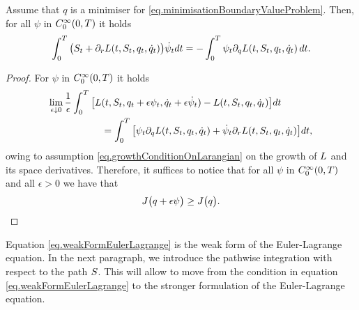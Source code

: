 \documentclass[10pt,a4paper]{article}
\begin{document}
\begin{appendices}
\begin{prop}
Assume that $q$ is a minimiser for \eqref{eq.minimisationBoundaryValueProblem}. Then, for all $\psi$ in $C^{\infty}_{0}(0,T)$ it holds 
\begin{equation}
\label{eq.weakFormEulerLagrange}
\int_{0}^{T} \big( S_t + \partial_r L (t,S_t,q_t,\dot{q}_t) \big ) \dot{\psi}_t dt 
= 
- \int_{0}^{T} \psi_t \partial_q L (t,S_t,q_t,\dot{q}_t) \, dt .
\end{equation}
\end{prop}
\begin{proof}
For $\psi$ in $C^{\infty}_{0}(0,T)$ it holds 
\begin{equation*}
\begin{split}
\lim_{\epsilon \downarrow 0} \frac{1}{\epsilon }\int_{0}^{T} \big[
	L &(t, S_t, q_t + \epsilon \psi_t, \dot{q}_t + \epsilon \dot{\psi}_t ) -  L (t,S_t,q_t, \dot{q}_t  )
\big] dt \\
& = \int_{0}^{T} \big[
	\psi_t \partial_q  L (t,S_t,q_t, \dot{q}_t  ) + \dot{\psi}_t \partial_r  L (t,S_t,q_t, \dot{q}_t  )
\big] dt, 
\end{split}
\end{equation*}
owing to assumption \eqref{eq.growthConditionOnLarangian} on the growth of $L$ and its space derivatives. Therefore, it suffices to notice that for all $\psi$ in $C^{\infty}_{0}(0,T)$ and all $\epsilon>0$ we have that 
\begin{equation*}
J \big( q+\epsilon\psi \big) \geq J \big( q\big).
\end{equation*}
\end{proof}

Equation \eqref{eq.weakFormEulerLagrange} is the weak form of the Euler-Lagrange equation. In the next  paragraph, we introduce the pathwise integration with respect to the path $S$. This will allow to move from the condition in equation \eqref{eq.weakFormEulerLagrange} to the stronger formulation of the Euler-Lagrange equation. 


\end{appendices}
\end{document}
